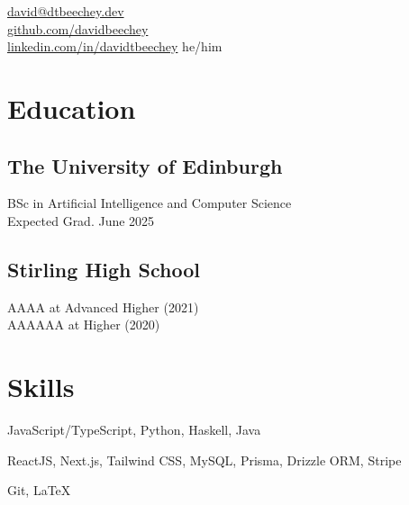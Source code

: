 \documentclass[]{hieudo-build}
\begin{document}
%
%
{
	\faEnvelope \href{mailto:david@dtbeechey.dev}{ david@dtbeechey.dev}\\
	\faGithub \href{https://github.com/davidbeechey}{ github.com/davidbeechey}\\
	\faLinkedinSquare \href{https://www.linkedin.com/in/davidtbeechey}{ linkedin.com/in/davidtbeechey}
}{he/him}

%
%
\begin{minipage}[t]{0.36\textwidth}

	\section{Education}

	\subsection{The University of Edinburgh}
	BSc in Artificial Intelligence and Computer Science \\
	Expected Grad. June 2025 \\
	\minisectionsep

	\subsection{Stirling High School}
	AAAA at Advanced Higher (2021) \\
	AAAAAA at Higher (2020) \\
	\minisectionsep

	\section{Skills}
	JavaScript/TypeScript, Python, Haskell, Java \\
	\minisectionsep

	ReactJS, Next.js, Tailwind CSS, MySQL, Prisma, Drizzle ORM, Stripe \\
	\minisectionsep

	Git, \LaTeX \\
	\minisectionsep


\end{minipage}
\end{document}
